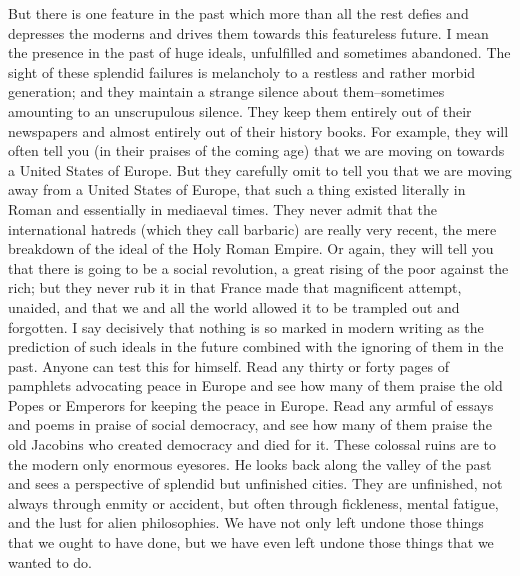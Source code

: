 \documentclass[final,10pt,letterpaper,twocolumn,openany]{book}
\begin{document}
But there is one feature in the past which more than all the rest defies
and depresses the moderns and drives them towards this featureless future.
I mean the presence in the past of huge ideals, unfulfilled and sometimes
abandoned. The sight of these splendid failures is melancholy to a restless
and rather morbid generation; and they maintain a strange silence about
them--sometimes amounting to an unscrupulous silence. They keep them
entirely out of their newspapers and almost entirely out of their history
books. For example, they will often tell you (in their praises of the coming
age) that we are moving on towards a United States of Europe. But they
carefully omit to tell you that we are moving away from a United States of
Europe, that such a thing existed literally in Roman and essentially in
mediaeval times. They never admit that the international hatreds (which
they call barbaric) are really very recent, the mere breakdown of the ideal
of the Holy Roman Empire. Or again, they will tell you that there is going
to be a social revolution, a great rising of the poor against the rich; but
they never rub it in that France made that magnificent attempt, unaided,
and that we and all the world allowed it to be trampled out and forgotten. I
say decisively that nothing is so marked in modern writing as the
prediction of such ideals in the future combined with the ignoring of them
in the past. Anyone can test this for himself. Read any thirty or forty pages
of pamphlets advocating peace in Europe and see how many of them
praise the old Popes or Emperors for keeping the peace in Europe. Read
any armful of essays and poems in praise of social democracy, and see
how many of them praise the old Jacobins who created democracy and
died for it. These colossal ruins are to the modern only enormous eyesores.
He looks back along the valley of the past and sees a perspective of
splendid but unfinished cities. They are unfinished, not always through
enmity or accident, but often through fickleness, mental fatigue, and the
lust for alien philosophies. We have not only left undone those things that
we ought to have done, but we have even left undone those things that we
wanted to do.
\end{document}
